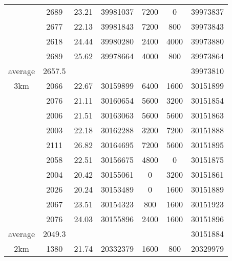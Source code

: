 \documentclass[a4paper,11pt]{article}
\begin{document}
{\begin{center}
\begin{tabular}{|c|c|c|c|c|c|c|}
           &       2689 &      23.21 &   39981037 &       7200 &          0 &   39973837 \\

           &       2677 &      22.13 &   39981843 &       7200 &        800 &   39973843 \\

           &       2618 &      24.44 &   39980280 &       2400 &       4000 &   39973880 \\

           &       2689 &      25.62 &   39978664 &       4000 &        800 &   39973864 \\
\hline %
   average &     2657.5 &            &            &            &            &   39973810 \\
\hline %
       3km &       2066 &      22.67 &   30159899 &       6400 &       1600 &   30151899 \\

           &       2076 &      21.11 &   30160654 &       5600 &       3200 &   30151854 \\

           &       2006 &      21.51 &   30163063 &       5600 &       5600 &   30151863 \\

           &       2003 &      22.18 &   30162288 &       3200 &       7200 &   30151888 \\

           &       2111 &      26.82 &   30164695 &       7200 &       5600 &   30151895 \\

           &       2058 &      22.51 &   30156675 &       4800 &          0 &   30151875 \\

           &       2004 &      20.42 &   30155061 &          0 &       3200 &   30151861 \\

           &       2026 &      20.24 &   30153489 &          0 &       1600 &   30151889 \\

           &       2067 &      23.51 &   30154323 &        800 &       1600 &   30151923 \\

           &       2076 &      24.03 &   30155896 &       2400 &       1600 &   30151896 \\
\hline %
   average &     2049.3 &            &            &            &            &   30151884 \\
\hline %
       2km &       1380 &      21.74 &   20332379 &       1600 &        800 &   20329979 \\


\end{tabular}
\end{center}}
\end{document}
